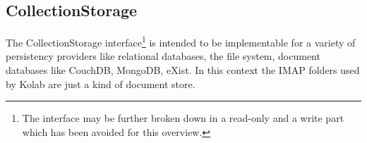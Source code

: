 \documentclass[12pt,a4paper,twoside]{scrartcl}		%
\begin{document}








\subsection{CollectionStorage}
\label{sec:collectionstorage}

The CollectionStorage interface\footnote{The interface may be further broken
  down in a read-only and a write part which has been avoided for this
  overview.} is intended to be implementable for a variety of persistency
providers like relational databases, the file system, document databases like
CouchDB, MongoDB, eXist. In this context the IMAP folders used by Kolab are just
a kind of document store.
\end{document}

